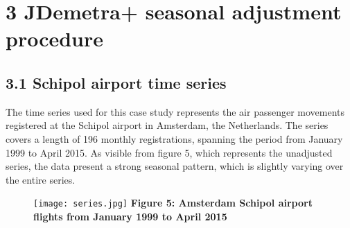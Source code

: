 \documentclass{article}
\begin{document}
\section*{3 JDemetra+ seasonal adjustment procedure}
\subsection*{\small 3.1 Schipol airport time series}
The time series used for this case study represents the air passenger movements registered at the Schipol airport in Amsterdam, the Netherlands. The series covers a length of 196 monthly registrations, spanning the period from January 1999 to April 2015. As visible from figure 5, which represents the unadjusted series, the data present a strong seasonal pattern, which is slightly varying over the entire series.
\begin{figure}[H]
\centering
  \texttt{[image: series.jpg]}
  {\textbf{\scriptsize Figure 5: Amsterdam Schipol airport flights from January 1999 to April 2015}}
  \label{fig:1}
\end{figure}
\end{document}
